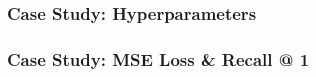 \documentclass{beamer}
\begin{document}

\begin{frame}[fragile]
\frametitle{Case Study: Hyperparameters}



\end{frame}


\begin{frame}[fragile]
\frametitle{Case Study: MSE Loss \& Recall @ 1}


\end{frame}
\end{document}
